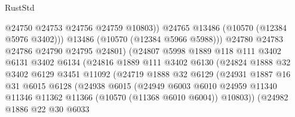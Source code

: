 \begin{lexlean}{RustStd}
\begin{coremodule}
                                    @24750
                                    @24753
                                    @24756
                                    @24759
                                    @10803))
                                @24765
                                @13486
                                (@10570 (@12384 @5976 @3402)))
                              @13486
                              (@10570 (@12384 @5966 @5988)))
                            @24780
                            @24783
                            @24786
                            @24790
                            @24795
                            @24801)
                          (@24807
                            @5998
                            @1889
                            @118
                            @111
                            @3402
                            @6131
                            @3402
                            @6134
                            (@24816
                              @1889
                              @111
                              @3402
                              @6130
                              (@24824
                                @1888
                                @32
                                @3402
                                @6129
                                @3451
                                @11092
                                (@24719
                                  @1888
                                  @32
                                  @6129
                                  (@24931
                                    @1887
                                    @16
                                    @31
                                    @6015
                                    @6128
                                    (@24938
                                      @6015
                                      (@24949
                                        @6003
                                        @6010
                                        @24959
                                        @11340
                                        @11346
                                        @11362
                                        @11366
                                        (@10570 (@11368 @6010 @6004))
                                        @10803))
                                    (@24982
                                      @1886
                                      @22
                                      @30
                                      @6033

\end{coremodule}
\end{lexlean}
